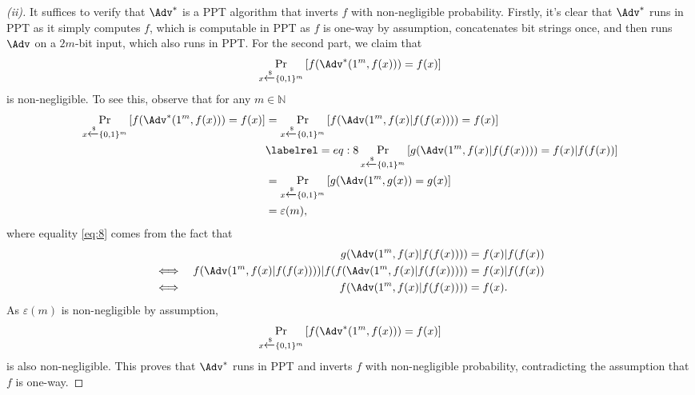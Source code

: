 \begin{proof}[(ii)]
    It suffices to verify that $\Adv^\ast$ is a PPT algorithm that inverts $f$ with non-negligible probability. Firstly, it's clear that $\Adv^\ast$ runs in PPT as it simply computes $f$, which is computable in PPT as $f$ is one-way by assumption, concatenates bit strings once, and then runs $\Adv$ on a $2m$-bit input, which also runs in PPT. For the second part, we claim that
    \[
    \Pr_{x\xleftarrow{\$}\{0,1\}^m}\left[f(\Adv^\ast(1^m, f(x))) = f(x)\right]
    \]
    is non-negligible. To see this, observe that for any $m\in\mathbb{N}$
    \begin{align*}
        \Pr_{x\xleftarrow{\$}\{0,1\}^m}\left[f(\Adv^\ast(1^m, f(x))) = f(x)\right]
        &= \Pr_{x\xleftarrow{\$}\{0,1\}^m}\left[f(\Adv(1^{m}, f(x)|f(f(x)))) = f(x)\right]\\
        &\labelrel={eq:8} \Pr_{x\xleftarrow{\$}\{0,1\}^m}\left[g(\Adv(1^{m}, f(x)|f(f(x)))) = f(x)|f(f(x))\right]\\
        &= \Pr_{x\xleftarrow{\$}\{0,1\}^m}\left[g(\Adv(1^{m}, g(x)) = g(x)\right]\\
        &= \varepsilon(m),
    \end{align*}
    where equality \eqref{eq:8} comes from the fact that
    \begin{align*}
    &&g(\Adv(1^{m}, f(x)|f(f(x)))) &= f(x)|f(f(x))\\
    \iff&& f(\Adv(1^{m}, f(x)|f(f(x))))|f(f(\Adv(1^{m}, f(x)|f(f(x))))) &= f(x)|f(f(x)) \\
    \iff&& f(\Adv(1^{m}, f(x)|f(f(x)))) &= f(x).
    \end{align*}
    As $\varepsilon(m)$ is non-negligible by assumption,
    \[
    \Pr_{x\xleftarrow{\$}\{0,1\}^m}\left[f(\Adv^\ast(1^m, f(x))) = f(x)\right]
    \]
    is also non-negligible. This proves that $\Adv^\ast$ runs in PPT and inverts $f$ with non-negligible probability, contradicting the assumption that $f$ is one-way.
\end{proof}



